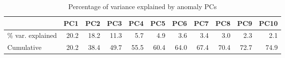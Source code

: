 \begin{table}
\caption{Percentage of variance explained by anomaly PCs}
\begin{tabular}{lrrrrrrrrrr}
\toprule
 & PC1 & PC2 & PC3 & PC4 & PC5 & PC6 & PC7 & PC8 & PC9 & PC10 \\
\midrule
\% var. explained & 20.2 & 18.2 & 11.3 & 5.7 & 4.9 & 3.6 & 3.4 & 3.0 & 2.3 & 2.1 \\
Cumulative & 20.2 & 38.4 & 49.7 & 55.5 & 60.4 & 64.0 & 67.4 & 70.4 & 72.7 & 74.9 \\
\bottomrule
\end{tabular}
\end{table}
